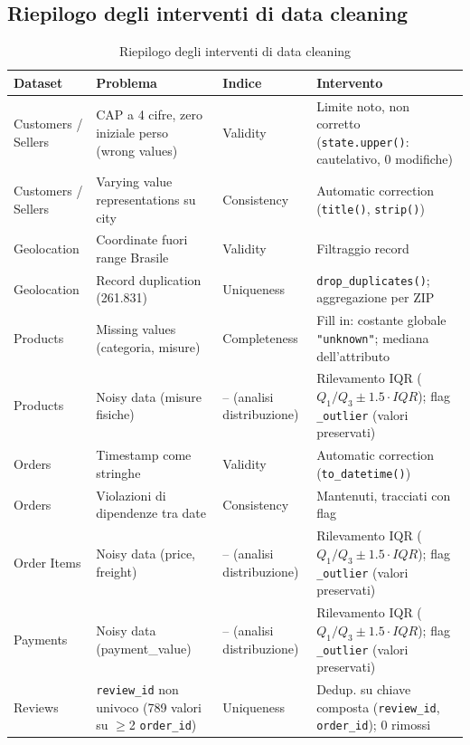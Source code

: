 \documentclass[12pt,a4paper]{article}
\begin{document}
\subsection{Riepilogo degli interventi di data cleaning}

\begin{table}[H]
  \centering
  \caption{Riepilogo degli interventi di data cleaning}
  \label{tab:cleaning}
  \begin{tabular}{>{\raggedright}p{2.5cm}
                  >{\raggedright}p{3.5cm}
                  >{\raggedright}p{2.5cm}
                  >{\raggedright\arraybackslash}p{4cm}}
    \toprule
    \textbf{Dataset} & \textbf{Problema} & \textbf{Indice} & \textbf{Intervento} \\
    \midrule
    Customers / Sellers & CAP a 4 cifre, zero iniziale perso (wrong values) & Validity &
      Limite noto, non corretto (\texttt{state.upper()}: cautelativo, 0 modifiche) \\
    Customers / Sellers & Varying value representations su city & Consistency &
      Automatic correction (\texttt{title()}, \texttt{strip()}) \\
    Geolocation & Coordinate fuori range Brasile & Validity &
      Filtraggio record \\
    Geolocation & Record duplication (261.831) & Uniqueness &
      \texttt{drop\_duplicates()}; aggregazione per ZIP \\
    Products & Missing values (categoria, misure) & Completeness &
      Fill in: costante globale \texttt{"unknown"}; mediana dell'attributo \\
    Products & Noisy data (misure fisiche) & -- (analisi distribuzione) &
      Rilevamento IQR ($Q_1/Q_3 \pm 1.5 \cdot IQR$); flag \texttt{\_outlier} (valori preservati) \\
    Orders & Timestamp come stringhe & Validity &
      Automatic correction (\texttt{to\_datetime()}) \\
    Orders & Violazioni di dipendenze tra date & Consistency &
      Mantenuti, tracciati con flag \\
    Order Items & Noisy data (price, freight) & -- (analisi distribuzione) &
      Rilevamento IQR ($Q_1/Q_3 \pm 1.5 \cdot IQR$); flag \texttt{\_outlier} (valori preservati) \\
    Payments & Noisy data (payment\_value) & -- (analisi distribuzione) &
      Rilevamento IQR ($Q_1/Q_3 \pm 1.5 \cdot IQR$); flag \texttt{\_outlier} (valori preservati) \\
    Reviews & \texttt{review\_id} non univoco (789 valori su $\geq$2 \texttt{order\_id}) & Uniqueness &
      Dedup. su chiave composta (\texttt{review\_id}, \texttt{order\_id}); 0 rimossi \\
    \bottomrule
  \end{tabular}
\end{table}
\end{document}
